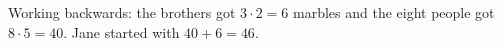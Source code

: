 Working backwards: the brothers got $3\cdot2=6$ marbles and the eight people got $8\cdot5=40$. Jane started with $40+6=\boxed{46}$.
